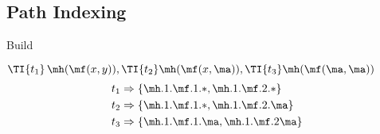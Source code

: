 











\subsection{Path Indexing}


\begin{example}{Build}
	\def\TRIEWIDTH{4cm}
	\def\TEXTWIDTH{\textwidth-\TRIEWIDTH-2em}

	\begin{minipage}{\TEXTWIDTH}
		\(
		\TI{t_1}\,\mh(\mf(x,y)),
		\TI{t_2}\mh(\mf( x,\ma)),
		\TI{t_3}\mh(\mf(\ma,\ma))
		 \)
		\begin{align*}
		t_1 &\Rightarrow \{ \mh.1.\mf.1.{*},  \mh.1.\mf.2.{*} \} \\
		t_2 &\Rightarrow \{ \mh.1.\mf.1.{*},  \mh.1.\mf.2.\ma \} \\
		t_3 &\Rightarrow \{ \mh.1.\mf.1.\ma,  \mh.1.\mf.2 \ma \}
		\end{align*}
	\end{minipage}
%
	\begin{minipage}{\TRIEWIDTH}
	\begin{tikzpicture}[->,dotted]
%		


		\end{tikzpicture}
	\end{minipage}
\end{example}


